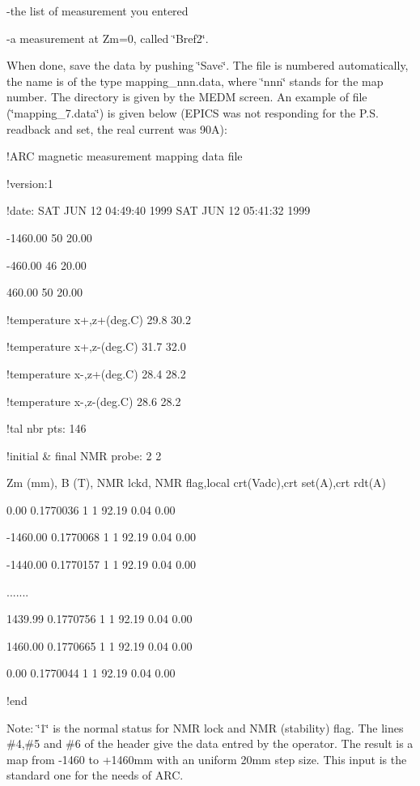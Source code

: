 -the list of measurement you entered 

-a measurement at Zm=0, called \char`\"{}Bref2\char`\"{}. 

When done, save the data by pushing \char`\"{}Save\char`\"{}. The file is numbered
automatically, the name is of the type mapping\_nnn.data, where \char`\"{}nnn\char`\"{}
stands for the map number. The directory is given by the MEDM screen. An example
of file (\char`\"{}mapping\_7.data\char`\"{}) is given below (EPICS was not
responding for the P.S. readback and set, the real current was 90A):

!ARC magnetic measurement mapping data file 

!version:1 

!date: SAT JUN 12 04:49:40 1999 SAT JUN 12 05:41:32 1999 

-1460.00 50 20.00 

-460.00 46 20.00 

460.00 50 20.00 

!temperature x+,z+(deg.C) 29.8 30.2 

!temperature x+,z-(deg.C) 31.7 32.0 

!temperature x-,z+(deg.C) 28.4 28.2 

!temperature x-,z-(deg.C) 28.6 28.2 

!tal nbr pts: 146 

!initial \& final NMR probe: 2 2 

Zm (mm), B (T), NMR lckd, NMR flag,local crt(Vadc),crt set(A),crt rdt(A) 

0.00 0.1770036 1 1 92.19 0.04 0.00 

-1460.00 0.1770068 1 1 92.19 0.04 0.00 

-1440.00 0.1770157 1 1 92.19 0.04 0.00 

....... 

1439.99 0.1770756 1 1 92.19 0.04 0.00 

1460.00 0.1770665 1 1 92.19 0.04 0.00 

0.00 0.1770044 1 1 92.19 0.04 0.00 

!end

Note: \char`\"{}1\char`\"{} is the normal status for NMR lock and NMR (stability)
flag. The lines \#4,\#5 and \#6 of the header give the data entred by the operator.
The result is a map from -1460 to +1460mm with an uniform 20mm step size. This
input is the standard one for the needs of ARC.

%
